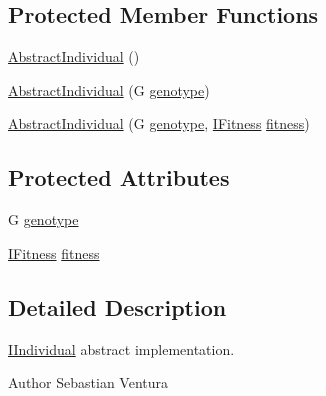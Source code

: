 \subsection*{Protected Member Functions}
\begin{DoxyCompactItemize}
\item 
\hyperlink{classnet_1_1sf_1_1jclec_1_1base_1_1_abstract_individual_3_01_g_01_4_ae7aec40ca86c7c56c43ca5eeaccc4b5d}{Abstract\-Individual} ()
\item 
\hyperlink{classnet_1_1sf_1_1jclec_1_1base_1_1_abstract_individual_3_01_g_01_4_a908ad0362124170763a1a2863c92fd37}{Abstract\-Individual} (G \hyperlink{classnet_1_1sf_1_1jclec_1_1base_1_1_abstract_individual_3_01_g_01_4_a17532a6cefcacd7a913749d1f46d798c}{genotype})
\item 
\hyperlink{classnet_1_1sf_1_1jclec_1_1base_1_1_abstract_individual_3_01_g_01_4_aafb14fd653c117449a34de7a19c2758a}{Abstract\-Individual} (G \hyperlink{classnet_1_1sf_1_1jclec_1_1base_1_1_abstract_individual_3_01_g_01_4_a17532a6cefcacd7a913749d1f46d798c}{genotype}, \hyperlink{interfacenet_1_1sf_1_1jclec_1_1_i_fitness}{I\-Fitness} \hyperlink{classnet_1_1sf_1_1jclec_1_1base_1_1_abstract_individual_3_01_g_01_4_a333045009734aca2834c6a7fab508fa2}{fitness})
\end{DoxyCompactItemize}
\subsection*{Protected Attributes}
\begin{DoxyCompactItemize}
\item 
G \hyperlink{classnet_1_1sf_1_1jclec_1_1base_1_1_abstract_individual_3_01_g_01_4_a17532a6cefcacd7a913749d1f46d798c}{genotype}
\item 
\hyperlink{interfacenet_1_1sf_1_1jclec_1_1_i_fitness}{I\-Fitness} \hyperlink{classnet_1_1sf_1_1jclec_1_1base_1_1_abstract_individual_3_01_g_01_4_a333045009734aca2834c6a7fab508fa2}{fitness}
\end{DoxyCompactItemize}


\subsection{Detailed Description}
\hyperlink{interfacenet_1_1sf_1_1jclec_1_1_i_individual}{I\-Individual} abstract implementation.

\begin{DoxyAuthor}{Author}
Sebastian Ventura
\end{DoxyAuthor}

